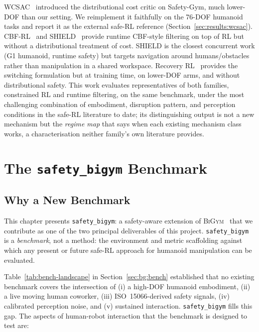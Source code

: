 \documentclass[11pt,a4paper]{report}
\newcommand{\iso}{ISO~15066}
\newcommand{\bigym}{\textsc{BiGym}}
\newcommand{\sbigym}{\texttt{safety\_bigym}}
\begin{document}
WCSAC~\cite{yang2021wcsac} introduced the distributional cost
critic on Safety-Gym, much lower-DOF than our setting. We
reimplement it faithfully on the 76-DOF humanoid tasks and report it
as the external safe-RL reference
(Section~\ref{sec:results:wcsac}). CBF-RL~\cite{cbfrl2024} and
SHIELD~\cite{shield2025} provide runtime CBF-style filtering on top
of RL but without a distributional treatment of cost. SHIELD is the
closest concurrent work (G1 humanoid, runtime safety) but targets
navigation around humans/obstacles rather than manipulation in a
shared workspace. Recovery RL~\cite{thananjeyan2021recovery}
provides the switching formulation but at training time, on
lower-DOF arms, and without distributional safety. This work
evaluates representatives of both families, constrained RL and
runtime filtering, on the same benchmark, under the most challenging
combination of embodiment, disruption pattern, and perception
conditions in the safe-RL literature to date; its distinguishing
output is not a new mechanism but the \emph{regime map} that says
when each existing mechanism class works, a characterisation neither
family's own literature provides.

\chapter{The \texorpdfstring{\sbigym{}}{safety\_bigym} Benchmark}
\label{ch:benchmark-env}

\section{Why a New Benchmark}
\label{sec:bench:why}

This chapter presents \sbigym{}: a safety-aware
extension of \bigym{}~\cite{chernyadev2024bigym} that we contribute
as one of the two principal deliverables of this project. \sbigym{}
is a \emph{benchmark}, not a method: the environment and
metric scaffolding against which any present or future safe-RL
approach for humanoid manipulation can be evaluated.

Table~\ref{tab:bench-landscape} in Section~\ref{sec:bg:bench}
established that no existing benchmark covers the intersection of
(i) a high-DOF humanoid embodiment, (ii) a live moving human
coworker, (iii) \iso{}-derived safety signals, (iv) calibrated
perception noise, and (v) sustained interaction. \sbigym{} fills
this gap. The aspects of human-robot interaction that the
benchmark is designed to test are:
\end{document}

